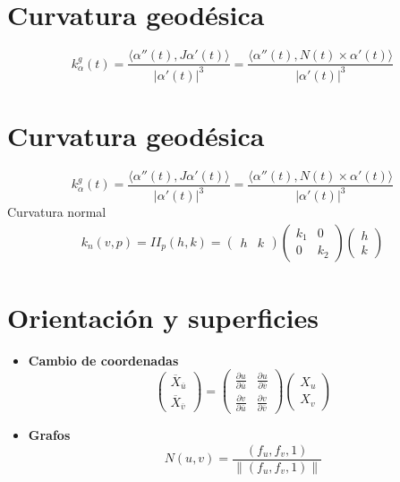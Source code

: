 \documentclass[8pt]{article}
\begin{document}
\begin{multicols}{3}
\section*{Curvatura geodésica}
\[
k^g_\alpha(t) =
\frac{\langle \alpha''(t), J\alpha'(t) \rangle}{|\alpha'(t)|^3}
=
\frac{\langle \alpha''(t), N(t) \times \alpha'(t) \rangle}{|\alpha'(t)|^3}
\]

\section*{Curvatura geodésica}
\[
k^g_\alpha(t) =
\frac{\langle \alpha''(t), J\alpha'(t) \rangle}{|\alpha'(t)|^3}
=
\frac{\langle \alpha''(t), N(t) \times \alpha'(t) \rangle}{|\alpha'(t)|^3}
\]
Curvatura normal
\begin{align*}
  k_{n}(v,p)=II_p(h,k)=\begin{pmatrix}
    h & k
  \end{pmatrix}\begin{pmatrix}
    k_{1} & 0 \\
    0 & k_2
  \end{pmatrix}\begin{pmatrix}
    h\\
    k
  \end{pmatrix}
\end{align*}
\section*{Orientación y superficies}
\begin{itemize}
  \item \textbf{Cambio de coordenadas}
  \[
  \begin{pmatrix}
    \overline{X}_{\overline{u}} \\
    \overline{X}_{\overline{v}}
  \end{pmatrix}
  =
  \begin{pmatrix}
    \frac{\partial u}{\partial \overline{u}} & \frac{\partial u}{\partial \overline{v}} \\
    \frac{\partial v}{\partial \overline{u}} & \frac{\partial v}{\partial \overline{v}}
  \end{pmatrix}
  \begin{pmatrix}
    X_{u} \\
    X_{v}
  \end{pmatrix}
  \]

  \item \textbf{Grafos} 
  \[
  N(u,v)=\frac{(f_{u}, f_{v}, 1)}{\|(f_{u}, f_{v}, 1)\|}
  \]


\end{itemize}
\end{multicols}
\end{document}
